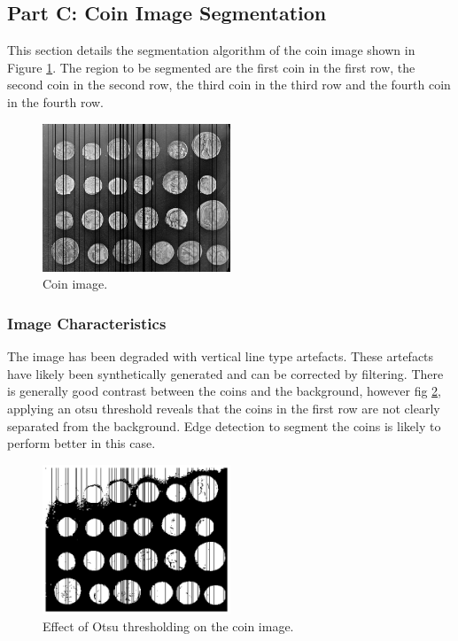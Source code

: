 \documentclass[11pt]{article}
\begin{document}
\subsection{Part C: Coin Image Segmentation}
This section details the segmentation algorithm of the coin image shown in Figure \ref{fig:coins_image}. The region to be segmented are the first coin in the first row, the second coin in the second row, the third coin in the third row and the fourth coin in the fourth row.
\begin{figure}[H]
    \centering
    \includegraphics[width=0.5\textwidth]{../data/coins.png}
    \caption{Coin image.}
    \label{fig:coins_image}
\end{figure}

\subsubsection{Image Characteristics}
The image has been degraded with vertical line type artefacts. These artefacts have likely been synthetically generated and can be corrected by filtering. There is generally good contrast between the coins and the background, however fig \ref{fig:otsu_threshold_coins}, applying an otsu threshold reveals that the coins in the first row are not clearly separated from the background. Edge detection to segment the coins is likely to perform better in this case.

\begin{figure}[H]
    \centering
    \includegraphics[width=0.5\textwidth]{figs/q1c_otsu_thresholded.png}  %
    \caption{Effect of Otsu thresholding on the coin image.}
    \label{fig:otsu_threshold_coins}
\end{figure}
\end{document}
